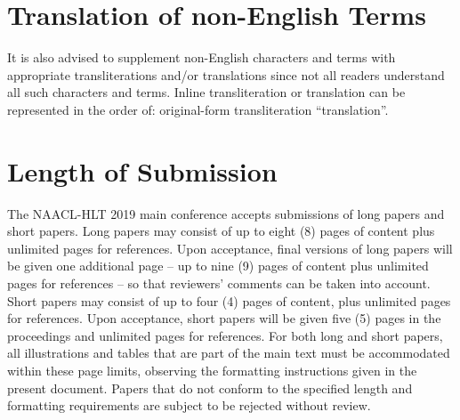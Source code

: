\documentclass[11pt,a4paper]{article}
\begin{document}


\section{Translation of non-English Terms}

It is also advised to supplement non-English characters and terms
with appropriate transliterations and/or translations
since not all readers understand all such characters and terms.
Inline transliteration or translation can be represented in
the order of: original-form transliteration ``translation''.

\section{Length of Submission}
\label{sec:length}

The NAACL-HLT 2019 main conference accepts submissions of long papers and
short papers.
 Long papers may consist of up to eight (8) pages of
content plus unlimited pages for references. Upon acceptance, final
versions of long papers will be given one additional page -- up to nine (9)
pages of content plus unlimited pages for references -- so that reviewers' comments
can be taken into account. Short papers may consist of up to four (4)
pages of content, plus unlimited pages for references. Upon
acceptance, short papers will be given five (5) pages in the
proceedings and unlimited pages for references. 
For both long and short papers, all illustrations and tables that are part
of the main text must be accommodated within these page limits, observing
the formatting instructions given in the present document. Papers that do not conform to the specified length and formatting requirements are subject to be rejected without review.
\end{document}
